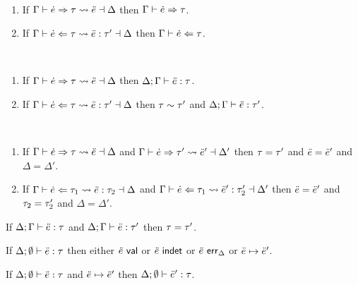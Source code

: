 \begin{theorem} ~
  \begin{enumerate}
    \item If $\Gamma \vdash \dot{e} \Rightarrow \tau \leadsto \ddot{e} \dashv \Delta$ then $\Gamma \vdash \dot{e} \Rightarrow \tau$.
    \item If $\Gamma \vdash \dot{e} \Leftarrow \tau \leadsto \ddot{e} : \tau' \dashv \Delta$ then $\Gamma \vdash \dot{e} \Leftarrow \tau$.
  \end{enumerate}
\end{theorem}

\begin{theorem} ~
  \begin{enumerate}
    \item If $\Gamma \vdash \dot{e} \Rightarrow \tau \leadsto \ddot{e} \dashv \Delta$ then $\Delta; \Gamma \vdash \ddot{e} : \tau$.
    \item If $\Gamma \vdash \dot{e} \Leftarrow \tau \leadsto \ddot{e} : \tau' \dashv \Delta$ then $\tau \sim \tau'$ and $\Delta; \Gamma \vdash \ddot{e} : \tau'$.
  \end{enumerate}
\end{theorem}

\begin{theorem} ~
  \begin{enumerate}
    \item If $\Gamma \vdash \dot{e} \Rightarrow \tau \leadsto \ddot{e} \dashv \Delta$ and $\Gamma \vdash \dot{e} \Rightarrow \tau' \leadsto \ddot{e}' \dashv \Delta'$ then $\tau=\tau'$ and $\ddot{e}=\ddot{e}'$ and $\Delta=\Delta'$.
    \item If $\Gamma \vdash \dot{e} \Leftarrow \tau_1 \leadsto \ddot{e} : \tau_2 \dashv \Delta$ and $\Gamma \vdash \dot{e} \Leftarrow \tau_1 \leadsto \ddot{e}' : \tau_2' \dashv \Delta'$ then $\ddot{e}=\ddot{e}'$ and $\tau_2=\tau_2'$ and $\Delta=\Delta'$.
  \end{enumerate}
\end{theorem}

\begin{theorem}
If $\Delta; \Gamma \vdash \ddot{e} : \tau$ and $\Delta; \Gamma \vdash \ddot{e} : \tau'$ then $\tau=\tau'$.
\end{theorem}

\begin{theorem}[Progress]
If $\Delta; \emptyset \vdash \ddot{e} : \tau$ then either $\ddot{e}~\mathsf{val}$ or $\ddot{e}~\mathsf{indet}$ or $\ddot{e}~\mathsf{err}_{\Delta}$ or $\ddot{e} \mapsto \ddot{e}'$.
\end{theorem}

\begin{theorem}[Preservation]
  If $\Delta; \emptyset \vdash \ddot{e} : \tau$ and $\ddot{e} \mapsto \ddot{e}'$ then $\Delta; \emptyset \vdash \ddot{e}' : \tau$. 
\end{theorem}




